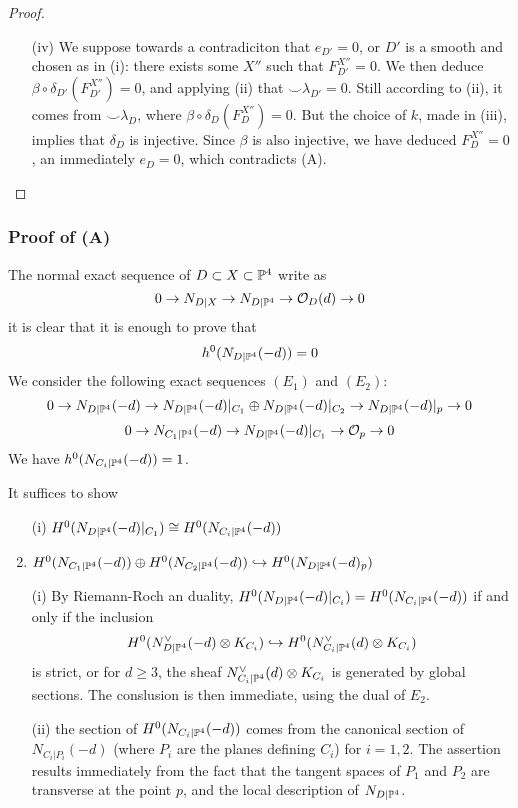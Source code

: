 \documentclass[12pt]{article}
\begin{document}
\begin{proof}
\begin{enumerate}
\item[(iv)] We suppose towards a contradiciton that $e_{D'} = 0$, or $D'$ is a smooth and chosen as in (i): there exists some $X''$ such that $F^{X''}_{D'} = 0$. We then deduce $\beta \circ \delta_{D'}(F^{X''}_{D'}) = 0$, and applying (ii) that $\smile \lambda_{D'} = 0$.  Still according to (ii),  it comes from $\smile \lambda_D$, where $\beta \circ \delta_D(F^{X''}_{D}) = 0$. But the choice of $k$, made in (iii), implies that $\delta_D$ is injective. Since $\beta$ is also injective, we have deduced $F^{X''}_{D} = 0$, an immediately $e_D = 0$, which contradicts (A).
\end{enumerate}
\end{proof}

\subsubsection{Proof of (A)}

The normal exact sequence of $D \subset X \subset \P^4$ write as 
\[ 0 \to N_{D|X} \to N_{D|\P^4} \to \struct{D}(d) \to 0 \]
it is clear that it is enough to prove that
\[ h^0(N_{D|\P^4}(-d)) = 0 \]
We consider the following exact sequences $(E_1)$ and $(E_2)$:
\[ 0 \to N_{D|\P^4}(-d) \to N_{D | \P^4}(-d)|_{C_1} \oplus N_{D | \P^4}(-d)|_{C_2} \to N_{D|\P^4}(-d)|_p \to 0 \] 
\[  0 \to N_{C_1 | \P^4}(-d) \to N_{D | \P^4}(-d)|_{C_1} \to \struct{p} \to 0 \]
We have $h^0(N_{C_i|\P^4}(-d)) = 1$.
\par 
It suffices to show
\begin{enumerate}
\item[(i)] $H^0(N_{D|\P^4}(-d)|_{C_1}) \cong H^0(N_{C_i | \P^4}(-d))$
\item $H^0(N_{C_1 | \P^4}(-d)) \oplus H^0(N_{C_2 | \P^4}(-d)) \embed H^0(N_{D | \P^4}(-d)_p)$
\end{enumerate}
\begin{enumerate}
\item[(i)] By Riemann-Roch an duality, $H^0(N_{D|\P^4}(-d)|_{C_i}) = H^0(N_{C_i | \P^4}(-d))$ if and only if the inclusion
\[ H^0(N_{D|\P^4}^\vee(-d) \ot K_{C_i}) \embed H^0(N_{C_i | \P^4}^\vee(d) \ot K_{C_i}) \]
is strict, or for $d \ge 3$, the sheaf $N_{C_i | \P^4}^\vee(d) \ot K_{C_i}$ is generated by global sections. The conslusion is then immediate, using the dual of $E_2$.

\item[(ii)] the section of $H^0(N_{C_i | \P^4}(-d))$ comes from the canonical section of $N_{C_i|P_i}(-d)$ (where $P_i$ are the planes defining $C_i$) for $i = 1,2$. The assertion results immediately from the fact that the tangent spaces of $P_1$ and $P_2$ are transverse at the point $p$, and the local description of $N_{D|\P^4}$. 
\end{enumerate}
\end{document}
